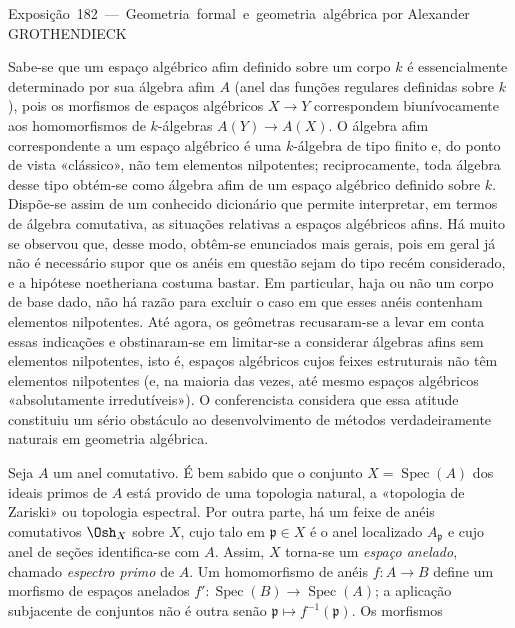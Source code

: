 \unit{Exposição 182 — Geometria formal e geometria algébrica}
%
  {por Alexander GROTHENDIECK}


Sabe-se que um espaço algébrico afim definido sobre um corpo $k$ é
essencialmente determinado por sua álgebra afim $A$ (anel das funções
regulares definidas sobre $k$), pois os morfismos de espaços algébricos
$X\longrightarrow Y$ correspondem biunívocamente aos homomorfismos de
$k$-álgebras $A(Y)\longrightarrow A(X)$. O álgebra afim correspondente a um
espaço algébrico é uma $k$-álgebra de tipo finito e, do ponto de vista
«clássico», não tem elementos nilpotentes; reciprocamente, toda álgebra desse
tipo obtém-se como álgebra afim de um espaço algébrico definido sobre $k$.
Dispõe-se assim de um conhecido dicionário que permite interpretar, em termos
de álgebra comutativa, as situações relativas a espaços algébricos afins.
Há muito se observou que, desse modo, obtêm-se enunciados mais gerais, pois em
geral já não é necessário supor que os anéis em questão sejam do tipo recém
considerado, e a hipótese noetheriana costuma bastar. Em particular, haja ou
não um corpo de base dado, não há razão para excluir o caso em que esses anéis
contenham elementos nilpotentes. Até agora, os geômetras recusaram-se a levar
em conta essas indicações e obstinaram-se em limitar-se a considerar álgebras
afins sem elementos nilpotentes, isto é, espaços algébricos cujos feixes
estruturais não têm elementos nilpotentes (e, na maioria das vezes, até mesmo
espaços algébricos «absolutamente irredutíveis»). O conferencista considera que
essa atitude constituiu um sério obstáculo ao desenvolvimento de métodos
verdadeiramente naturais em geometria algébrica.

Seja $A$ um anel comutativo. É bem sabido que o conjunto
$X=\operatorname{Spec}(A)$ dos ideais primos de $A$ está provido de uma
topologia natural, a «topologia de Zariski» ou topologia espectral. Por outra
parte, há um feixe de anéis comutativos $\Osh_X$ sobre $X$, cujo talo em
$\mathfrak p\in X$ é o anel localizado $A_{\mathfrak p}$ e cujo anel de
seções identifica-se com $A$. Assim, $X$ torna-se um \emph{espaço
anelado}, chamado \emph{espectro primo} de $A$. Um homomorfismo de anéis
$f:A\longrightarrow B$ define um morfismo de espaços anelados
$f':\operatorname{Spec}(B)\longrightarrow\operatorname{Spec}(A)$; a
aplicação subjacente de conjuntos não é outra senão
$\mathfrak p\longmapsto f^{-1}(\mathfrak p)$. Os morfismos

